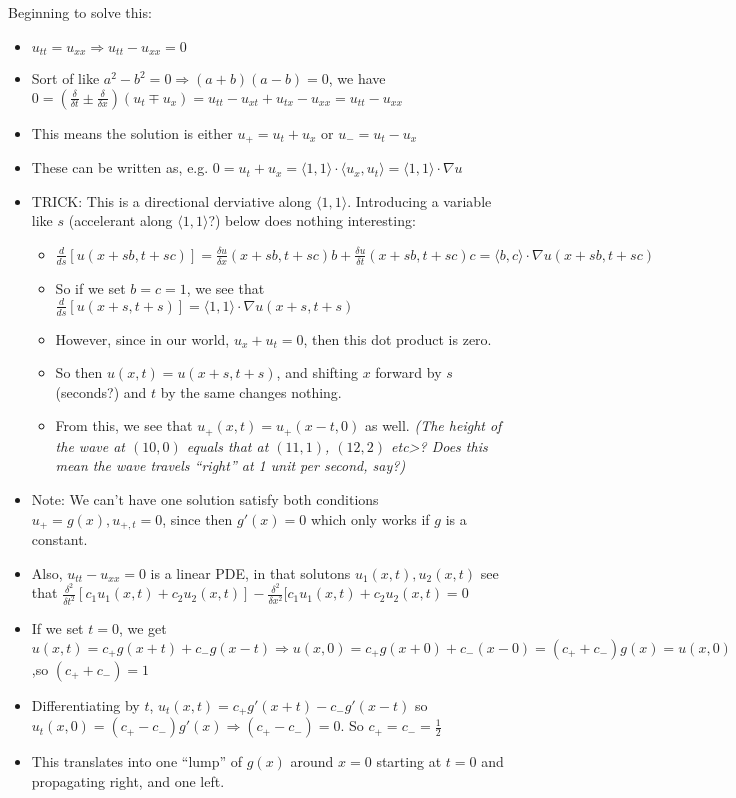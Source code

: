 \documentclass[11pt, oneside]{article}   	%
\begin{document}
Beginning to solve this:
\begin{itemize}
\item $u_{tt} = u_{xx} \Rightarrow u_{tt} - u_{xx} = 0$
\item Sort of like $a^2 - b^2 = 0 \Rightarrow (a+b)(a-b) = 0$, we have $0 = (\frac{\delta}{\delta t} \pm \frac{\delta}{\delta x})(u_t \mp u_x) 
= u_{tt} - u_{xt} + u_{tx} - u_{xx} = u_{tt} - u_{xx}$
\item This means the solution is either $u_+ = u_{t} + u_{x}$ or $u_- = u_{t} - u_{x}$
\item These can be written as, e.g. $0 = u_t + u_x = \langle 1, 1 \rangle \cdot \langle u_x, u_t  \rangle =  \langle 1, 1 \rangle \cdot \nabla u$
\item TRICK: This is a directional derviative along $\langle 1, 1 \rangle$.  Introducing a variable like $s$ (accelerant along $\langle 1,1 \rangle $?) below does nothing interesting:
\begin{itemize}
\item $\frac{d}{ds}[u(x+sb, t+sc)] = \frac{\delta u}{\delta x}(x+sb,t+sc)b +  \frac{\delta u}{\delta t}(x+sb,t+sc)c = \langle b, c\rangle \cdot \nabla u(x+sb, t+sc)$
\item So if we set $b = c =1$, we see that $\frac{d}{ds}[u(x+s, t+s)] = \langle 1, 1\rangle \cdot \nabla u(x+s, t+s)$
\item However, since in our world, $u_x + u_t = 0$, then this dot product is zero.  
\item So then $u(x,t) = u(x+s, t+s)$, and shifting $x$ forward by $s$ (seconds?) and $t$ by the same changes nothing.
\item From this, we see that $u_+(x, t) = u_+(x-t, 0)$ as well.  \emph{(The height of the wave at $(10, 0)$ equals that at $(11, 1)$, $(12, 2)$ etc>?  Does this mean the wave travels ``right'' at 1 unit per second, say?)}
\end{itemize}
\item Note: We can't have one solution satisfy both conditions $u_+ = g(x), u_{+,t} = 0$, since then $g'(x) = 0$ which only works if $g$ is a constant.
\item Also, $u_{tt} - u_{xx} = 0$ is a linear PDE, in that solutons $u_1(x,t), u_2(x,t)$ see that $\frac{\delta^2}{\delta t^2}[c_1u_1(x,t) + c_2u_2(x,t)] - \frac{\delta^2}{\delta x^2}[c_1u_1(x,t) + c_2u_2(x,t)= 0$
\item  If we set $t=0$, we get  $u(x,t) = c_+g(x+t)+c_-g(x-t) \Rightarrow u(x,0) = c_+g(x+0) + c_-(x-0) = (c_+ + c_-)g(x) = u(x,0)$ ,so $(c_+ + c_-) = 1$
\item Differentiating by $t$, $u_t(x,t) = c_+g'(x+t) - c_-g'(x-t)$ so $u_t(x,0) = (c_+ - c_-)g'(x) \Rightarrow (c_+ - c_-) = 0$.  So $c_+ = c_- = \frac{1}{2}$
\item This translates into one ``lump'' of $g(x)$ around $x=0$ starting at $t=0$ and propagating right, and one left.
\end{itemize}
\end{document}
